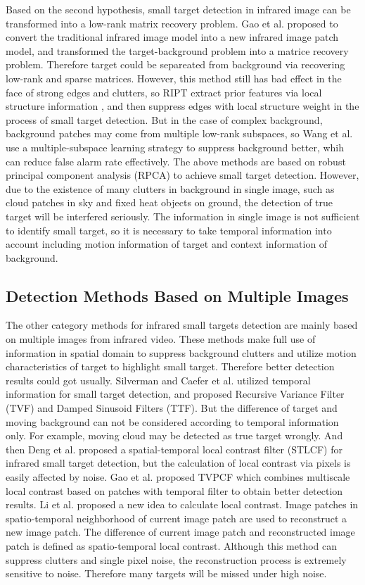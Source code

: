 \documentclass[journal]{IEEEtran}
\begin{document}
Based on the second hypothesis, small target detection in infrared image can be transformed into a low-rank matrix recovery problem. Gao et al.\cite{gao2013infrared} proposed to convert the traditional infrared image model into a new infrared image patch model, and transformed the target-background problem into a matrice recovery problem. Therefore target could be separeated from background via recovering low-rank and sparse matrices. However, this method still has bad effect in the face of strong edges and clutters, so RIPT\cite{dai2017reweighted} extract prior features via local structure information , and then suppress edges with local structure weight in the process of small target detection. But in the case of complex background, background patches may come from multiple low-rank subspaces, so Wang et al.\cite{wang2017infrared} use a multiple-subspace learning strategy to suppress background better, whih can reduce false alarm rate effectively. The above methods are based on robust principal component analysis (RPCA) to achieve small target detection. However, due to the existence of many clutters in background in single image, such as cloud patches in sky and fixed heat objects on ground, the detection of true target will be interfered seriously. The information in single image is not sufficient to identify small target, so it is necessary to take temporal information into account including motion information of target and context information of background.

\subsection{Detection Methods Based on Multiple Images}
The other category methods for infrared small targets detection are mainly based on multiple images from infrared video. These methods make full use of information in spatial domain to suppress background clutters and utilize motion characteristics of target to highlight small target. Therefore better detection results could got usually. Silverman and Caefer et al. utilized temporal information for small target detection, and proposed Recursive Variance Filter (TVF)\cite{silverman1998temporal} and Damped Sinusoid Filters (TTF)\cite{caefer1998temporal}. But the difference of target and moving background can not be considered according to temporal information only. For example, moving cloud may be detected as true target wrongly. And then Deng et al.\cite{deng2016infrared} proposed a spatial-temporal local contrast filter (STLCF) for infrared small target detection, but the calculation of local contrast via pixels is easily affected by noise. Gao et al. proposed TVPCF\cite{gao2017tvpcf} which combines multiscale local contrast based on patches with temporal filter to obtain better detection results. Li et al.\cite{li2016novel} proposed a new idea to calculate local contrast. Image patches in spatio-temporal neighborhood of current image patch are used to reconstruct a new image patch. The difference of current image patch and reconstructed image patch is defined as spatio-temporal local contrast. Although this method can suppress clutters and single pixel noise, the reconstruction process is extremely sensitive to noise. Therefore many targets will be missed under high noise.
\end{document}
